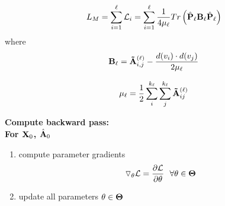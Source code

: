 \documentclass[a4paper,12pt]{article}
\begin{document}
\begin{itemize}
\begin{enumerate}
{{\begin{enumerate}
{					\[L_M = \sum_{i = 1}^{\ell} \mathcal{L}_i =  \sum_{i=1}^\ell \frac{1}{4\mu_\ell}Tr\left(\hat{\bf P}_\ell {\bf B_\ell} \hat{\bf P}_\ell\right)\]
					where\\
					\[{\bf B_\ell} = {\bf \tilde A}^{(\ell)}_{i,j} - \frac{d(v_i)\cdot d(v_j)}{2\mu_\ell}\]
					
					\[\mu_\ell = \frac{1}{2}\sum_i^{k_\ell} \sum_j^{k_\ell} {\bf \tilde A}^{(\ell)}_{ij}\]
					}
			\end{enumerate}
			}
			\item[2.2.3]{\textbf{Compute backward pass:}} \\
			\textbf{For ${\bf X}_0$, $\hat{\bf A}_0$ } 
			\begin{enumerate}
				\item[]{compute parameter gradients 
					\[\triangledown_\theta \mathcal{L} =  \frac{\partial\mathcal{L}}{\partial {\bf \theta}} \ \ \forall \theta \in {\bf \Theta}\]}
				
				\item[]{update all parameters $\theta \in {\bf \Theta}$}  
			\end{enumerate}
			
		}
		\end{enumerate} 
	
	\end{itemize}
	
	
\end{document}
